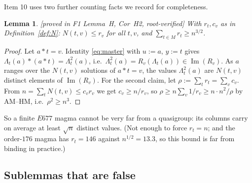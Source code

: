 \documentclass[11pt]{article}
\theoremstyle{plain}
\newtheorem{lemma}[theorem]{Lemma}
\theoremstyle{definition}
\theoremstyle{remark}
\numberwithin{equation}{section}
\newcommand{\op}{\mathbin{*}}
\newcommand{\Imm}{\operatorname{Im}}
\newcommand{\statusbox}[1]{{\small\sloppy\textsf{[#1]}}}
\newcommand{\PROVED}[1]{\statusbox{proved in #1, root-verified}}
\begin{document}
Item 10 uses two further counting facts we record for completeness.

\begin{lemma}\label{lem:H}
\PROVED{F1 Lemma~H, Cor~H2}
With $r_t,c_v$ as in Definition~\ref{def:N}: $N(t,v)\le r_v$ for all $t,v$, and
$\sum_{t\in M} r_t \ge n^{3/2}$.
\end{lemma}

\begin{proof}
Let $a\op t = v$. Identity \eqref{eq:master} with $u:=a$, $y:=t$ gives
$\Lambda_t(a)\op(a\op t) = \Lambda_t^2(a)$, i.e.\ $\Lambda_t^2(a) = R_v(\Lambda_t(a))\in\Imm(R_v)$.
As $a$ ranges over the $N(t,v)$ solutions of $a\op t = v$, the values $\Lambda_t^2(a)$ are
$N(t,v)$ distinct elements of $\Imm(R_v)$. For the second claim, let
$\rho := \sum_t r_t = \sum_v c_v$. From
$n = \sum_t N(t,v)\le c_vr_v$ we get $c_v\ge n/r_v$, so $\rho\ge n\sum_v 1/r_v \ge n\cdot n^2/\rho$
by AM--HM, i.e.\ $\rho^2\ge n^3$.
\end{proof}

So a finite $E677$ magma cannot be very far from a quasigroup: its columns carry on average at
least $\sqrt n$ distinct values. (Not enough to force $r_t = n$; and the order-$176$ magma has
$r_t = 146$ against $n^{1/2} = 13.3$, so this bound is far from binding in practice.)

\subsection{Sublemmas that are false}\label{sec:false}
\end{document}
